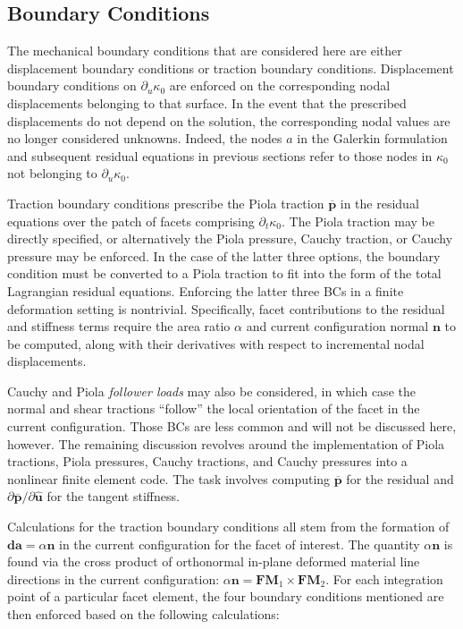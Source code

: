 \subsection{Boundary Conditions}
The mechanical boundary conditions that are considered here are either displacement boundary conditions or traction boundary conditions. Displacement boundary conditions on $\partial_u\kappa_0$ are enforced on the corresponding nodal displacements belonging to that surface. In the event that the prescribed displacements do not depend on the solution, the corresponding nodal values are no longer considered unknowns. Indeed, the nodes $a$ in the Galerkin formulation and subsequent residual equations in previous sections refer to those nodes in $\kappa_0$ not belonging to $\partial_u\kappa_0$.

Traction boundary conditions prescribe the Piola traction $\overline{\bm{p}}$ in the residual equations over the patch of facets comprising $\partial_t\kappa_0$. The Piola traction may be directly specified, or alternatively the Piola pressure, Cauchy traction, or Cauchy pressure may be enforced. In the case of the latter three options, the boundary condition must be converted to a Piola traction to fit into the form of the total Lagrangian residual equations. Enforcing the latter three BCs in a finite deformation setting is nontrivial. Specifically, facet contributions to the residual and stiffness terms require the area ratio $\alpha$ and current configuration normal $\bm{n}$ to be computed, along with their derivatives with respect to incremental nodal displacements.

Cauchy and Piola \textit{follower loads} may also be considered, in which case the normal and shear tractions ``follow'' the local orientation of the facet in the current configuration. Those BCs are less common and will not be discussed here, however. The remaining discussion revolves around the implementation of Piola tractions, Piola pressures, Cauchy tractions, and Cauchy pressures into a nonlinear finite element code. The task involves computing $\overline{\bm{p}}$ for the residual and ${\partial \bm{\overline{p}}}/{\partial {\hat {\bm{u}}}}$ for the tangent stiffness.

Calculations for the traction boundary conditions all stem from the formation of ${\bm {da}} = \alpha{\bm n}$ in the current configuration for the facet of interest. The quantity $\alpha{\bm n}$ is found via the cross product of orthonormal in-plane deformed material line directions in the current configuration: ${\alpha}{\bm n} = {\bm F}{\bm M}_1 \times {\bm F}{\bm M}_2$. For each integration point of a particular facet element, the four boundary conditions mentioned are then enforced based on the following calculations:

